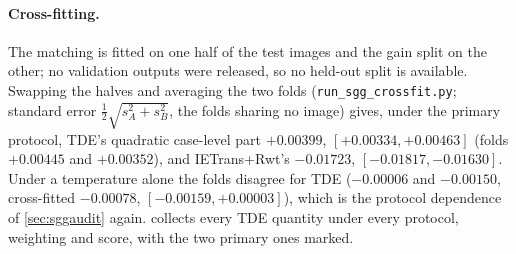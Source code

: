 \paragraph{Cross-fitting.} The matching is fitted on one half of the test images and the gain
split on the other; no validation outputs were released, so no held-out split is available.
Swapping the halves and averaging the two folds (\texttt{run\_sgg\_crossfit.py}; standard error
$\tfrac12\sqrt{s_A^2+s_B^2}$, the folds sharing no image) gives, under the primary protocol, TDE's
quadratic case-level part $+0.00399$, $[+0.00334,+0.00463]$ (folds $+0.00445$ and $+0.00352$), and
IETrans+Rwt's $-0.01723$, $[-0.01817,-0.01630]$. Under a temperature alone the folds disagree for
TDE ($-0.00006$ and $-0.00150$, cross-fitted $-0.00078$, $[-0.00159,+0.00003]$), which is the
protocol dependence of \cref{sec:sggaudit} again.  collects every TDE
quantity under every protocol, weighting and score, with the two primary ones marked.

\begin{table}[t]
\centering
\scriptsize
\setlength\tabcolsep{3pt}
\caption{\textbf{TDE against the baseline under every protocol}: mean-recall case-level parts
(graph-constrained mR and unconstrained ng-mR at $K=20,50,100$; against the baseline and against
the logit-adjusted control LA), proper-score case-level parts under three matching families
(and cross-fitted), and the within-cell AUC change under both weightings. Primary quantities
are marked; all others are secondary.}
\label{tab:tdesummary}

\end{table}

